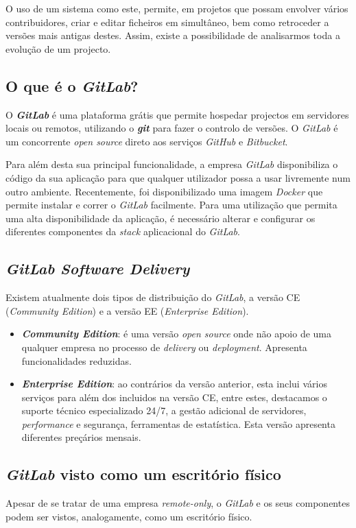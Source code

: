 \documentclass[12pt,a4paper]{article}
\begin{document}
O uso de um sistema como este, permite, em projetos que possam envolver vários contribuidores, criar e editar ficheiros em simultâneo, bem como retroceder a versões mais antigas destes. Assim, existe a possibilidade de analisarmos toda a evolução de um projecto.

\subsection{O que é o \emph{GitLab}?}
O \textbf{\emph{GitLab}} é uma plataforma grátis que permite hospedar projectos em servidores locais ou remotos, utilizando o \textbf{\emph{git}} para fazer o controlo de versões. O \emph{GitLab} é um concorrente \emph{open source} direto aos serviços \emph{GitHub} e \emph{Bitbucket}.

Para além desta sua principal funcionalidade, a empresa \emph{GitLab} disponibiliza o código da sua aplicação para que qualquer utilizador possa a usar livremente num outro ambiente. Recentemente, foi disponibilizado uma imagem \emph{Docker} que permite instalar e correr o \emph{GitLab} facilmente. Para uma utilização que permita uma alta disponibilidade da aplicação, é necessário alterar e configurar os diferentes componentes da \emph{stack} aplicacional do \emph{GitLab}.

\subsection{\emph{GitLab Software Delivery}}
Existem atualmente dois tipos de distribuição do \emph{GitLab}, a versão CE (\emph{Community Edition}) e a versão EE (\emph{Enterprise Edition}).

\begin{itemize}
    \item \textbf{\emph{Community Edition}}: é uma versão \emph{open source} onde não apoio de uma qualquer empresa no processo de \emph{delivery} ou \emph{deployment}. Apresenta funcionalidades reduzidas.
    \item \textbf{\emph{Enterprise Edition}}: ao contrários da versão anterior, esta inclui vários serviços para além dos incluidos na versão CE, entre estes, destacamos o suporte técnico especializado 24/7, a gestão adicional de servidores, \emph{performance} e segurança, ferramentas de estatística. Esta versão apresenta diferentes preçários mensais.
\end{itemize}

\subsection{\emph{GitLab} visto como um escritório físico}
Apesar de se tratar de uma empresa \emph{remote-only}, o \emph{GitLab} e os seus componentes podem ser vistos, analogamente, como um escritório físico.
\end{document}
